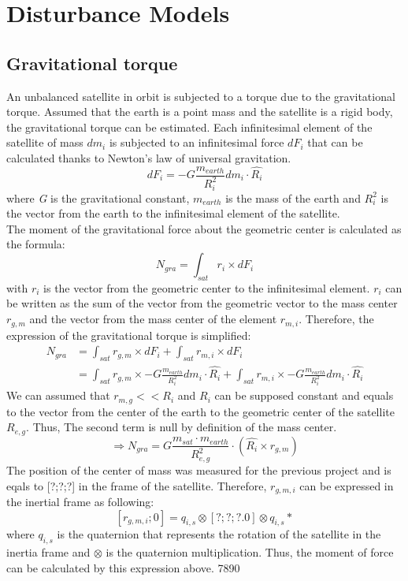 \section{Disturbance Models}\label{sec:useCase} 
\subsection{Gravitational torque}
An unbalanced satellite in orbit is subjected to a torque due to the gravitational torque. Assumed that the earth is a point mass and the satellite is a rigid body, the gravitational torque can be estimated. Each infinitesimal element of the satellite of mass \textit{$dm_i$} is subjected to an infinitesimal force \textit{$dF_i$} that can be calculated thanks to Newton's law of universal gravitation.
\[
dF_i = -G\frac{m_{earth}}{R_i^2}dm_i \cdot \hat{R_i}
\]
where \textit{G} is the gravitational constant, \textit{$m_{earth}$} is the mass of the earth and \textit{$R_i^2$} is the vector from the earth to the infinitesimal element of the satellite. \\
The moment of the gravitational force about the geometric center is calculated as the formula:
\[
N_{gra} = \int_{sat} r_i \times dF_i 
\]
with $r_i$ is the vector from the geometric center to the infinitesimal element. $r_i$ can be written as the sum of the vector from the geometric vector to the mass center $r_{g,m}$ and the vector from the mass center of the element $r_{m,i}$. Therefore, the expression of the gravitational torque is simplified:
\begin{align*}
	N_{gra} &= \int_{sat} r_{g,m} \times dF_i + \int_{sat} r_{m,i} \times dF_i \\
	&= \int_{sat} r_{g,m} \times -G\frac{m_{earth}}{R_i^2}dm_i \cdot \hat{R_i} + \int_{sat} r_{m,i} \times -G\frac{m_{earth}}{R_i^2}dm_i \cdot \hat{R_i}
\end{align*}
We can assumed that $r_{m,g} << R_i$ and $R_i$ can be supposed constant and equals to the vector from the center of the earth to the geometric center of the satellite $R_{e,g}$. Thus, The second term is null by definition of the mass center.
\[
\Rightarrow N_{gra} = G\frac{m_{sat} \cdot m_{earth}}{R_{e,g}^2} \cdot (\hat{R_i} \times r_{g,m})
\]
The position of the center of mass was measured for the previous project and is eqals to [?;?;?] in the frame of the satellite. Therefore, $r_{g,m,i}$ can be expressed in the inertial frame as following:
\[
[r_{g,m,i};0] = q_{i,s} \otimes [?;?;?.0] \otimes q_{i,s}*
\]
where $q_{i,s}$ is the quaternion that represents the rotation of the satellite in the inertia frame and $\otimes$ is the quaternion multiplication. Thus, the moment of force can be calculated by this expression above.
  7890